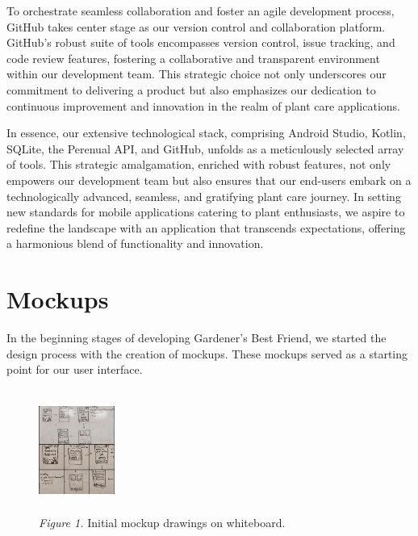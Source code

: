 \documentclass{sigchi}
\begin{document}
To orchestrate seamless collaboration and foster an agile development process, GitHub takes center stage as our version control and collaboration platform. GitHub's robust suite of tools encompasses version control, issue tracking, and code review features, fostering a collaborative and transparent environment within our development team. This strategic choice not only underscores our commitment to delivering a product but also emphasizes our dedication to continuous improvement and innovation in the realm of plant care applications.

In essence, our extensive technological stack, comprising Android Studio, Kotlin, SQLite, the Perenual API, and GitHub, unfolds as a meticulously selected array of tools. This strategic amalgamation, enriched with robust features, not only empowers our development team but also ensures that our end-users embark on a technologically advanced, seamless, and gratifying plant care journey. In setting new standards for mobile applications catering to plant enthusiasts, we aspire to redefine the landscape with an application that transcends expectations, offering a harmonious blend of functionality and innovation. \newline \newline \newline \newline \newline  \newline 



\section{Mockups}
In the beginning stages of developing Gardener's Best Friend, we started the design process with the creation of mockups. These mockups served as a starting point for our user interface.

\begin{figure}[H]
    \centering
    \includegraphics[width=2.5cm, height=4cm]{OldMockup}
	\\\emph{Figure 1.} Initial mockup drawings on whiteboard.
\end{figure}
\end{document}
